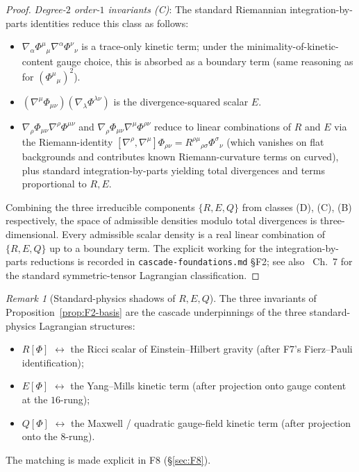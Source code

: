 \documentclass[12pt]{article}
\theoremstyle{definition}
\theoremstyle{remark}
\newtheorem{remark}[theorem]{Remark}
\begin{document}
\begin{proof}
\emph{Degree-$2$ order-$1$ invariants (C)}: The standard Riemannian integration-by-parts identities reduce this class as follows:
\begin{itemize}
\item $\nabla_\alpha \Phi^\mu{}_\mu \nabla^\alpha \Phi^\nu{}_\nu$ is a trace-only kinetic term; under the minimality-of-kinetic-content gauge choice, this is absorbed as a boundary term (same reasoning as for $(\Phi^\mu{}_\mu)^2$).
\item $(\nabla^\mu \Phi_{\mu\nu})(\nabla_\lambda \Phi^{\lambda\nu})$ is the divergence-squared scalar $E$.
\item $\nabla_\rho \Phi_{\mu\nu} \nabla^\rho \Phi^{\mu\nu}$ and $\nabla_\rho \Phi_{\mu\nu} \nabla^\mu \Phi^{\rho\nu}$ reduce to linear combinations of $R$ and $E$ via the Riemann-identity $[\nabla^\rho, \nabla^\mu] \Phi_{\rho\nu} = R^{\rho\mu}{}_{\rho\sigma} \Phi^{\sigma}{}_\nu$ (which vanishes on flat backgrounds and contributes known Riemann-curvature terms on curved), plus standard integration-by-parts yielding total divergences and terms proportional to $R, E$.
\end{itemize}

Combining the three irreducible components $\{R, E, Q\}$ from classes (D), (C), (B) respectively, the space of admissible densities modulo total divergences is three-dimensional. Every admissible scalar density is a real linear combination of $\{R, E, Q\}$ up to a boundary term. The explicit working for the integration-by-parts reductions is recorded in \texttt{cascade-foundations.md} \S F2; see also~\citep{Weinberg1995} Ch.~7 for the standard symmetric-tensor Lagrangian classification.
\end{proof}

\begin{remark}[Standard-physics shadows of $R, E, Q$]\label{rem:F2-shadows}
The three invariants of Proposition~\ref{prop:F2-basis} are the cascade underpinnings of the three standard-physics Lagrangian structures:
\begin{itemize}
\item $R[\Phi]$ $\leftrightarrow$ the Ricci scalar of Einstein--Hilbert gravity (after F7's Fierz--Pauli identification);
\item $E[\Phi]$ $\leftrightarrow$ the Yang--Mills kinetic term (after projection onto gauge content at the $16$-rung);
\item $Q[\Phi]$ $\leftrightarrow$ the Maxwell / quadratic gauge-field kinetic term (after projection onto the $8$-rung).
\end{itemize}
The matching is made explicit in F8 (\S\ref{sec:F8}).
\end{remark}
\end{document}

